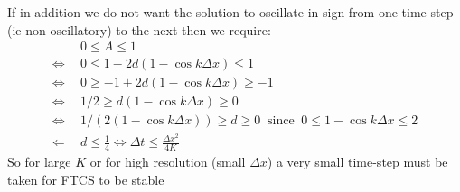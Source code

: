 {\begin{enumerate}
If in addition we do not want the solution to oscillate in sign from
one time-step (ie non-oscillatory) to the next then we require: 
\begin{align*}
 & 0\le A\le1\\
\iff & 0\le1-2d(1-\cos k\Delta x)\le1\\
\iff & 0\ge-1+2d(1-\cos k\Delta x)\ge-1\\
\iff & 1/2\ge d(1-\cos k\Delta x)\ge0\\
\iff & 1/(2(1-\cos k\Delta x))\ge d\ge0~\text{ since }~0\le1-\cos k\Delta x\le2\\
\Leftarrow~~ & d\le\frac{1}{4}\iff\Delta t\le\frac{\Delta x^{2}}{4K}
\end{align*}
So for large $K$ or for high resolution (small $\Delta x$) a very
small time-step must be taken for FTCS to be stable
\end{enumerate}
}
